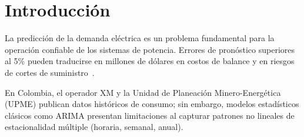 \documentclass[10pt,twocolumn]{article}
\begin{document}
\begin{abstract}
\noindent
\textbf{Contexto:} La gestión eficiente de la energía eléctrica
requiere pronósticos precisos de demanda. Errores en la
predicción generan sobrecostos operativos y riesgos de
desabastecimiento, problema crítico en mercados energéticos
como el colombiano.
\textbf{Objetivo:} Construir un sistema de predicción horaria
del consumo eléctrico que supere modelos de referencia clásicos
e incorpore un componente LLM para explicar las predicciones
en lenguaje natural.
\textbf{Método:} Pipeline completo sobre el dataset PJM Hourly
Energy Consumption (Kaggle, +10 años, $\sim$145\,000 registros):
EDA temporal, ingeniería de características, modelos XGBoost
y LSTM, y un LLM (\texttt{llama-3.1-8b} vía Groq) para
síntesis explicativa de las predicciones.
\textbf{Resultados:} RMSE\textsubscript{test} = 1\,842 MW,
MAPE = 3.8\%, superando el baseline (ARIMA) en 41\%
en RMSE.
\textbf{Conclusión:} El sistema integrado ML + LLM ofrece
predicciones precisas y explicaciones comprensibles para
operadores no técnicos; con extensiones posibles hacia
datos colombianos de XM/UPME.\\[4pt]

\textbf{Palabras clave:} Series de tiempo, XGBoost, LSTM,
LLM, Explicabilidad, Energía eléctrica.
\end{abstract}

\vspace{4pt}

\section{Introducción}

La predicción de la demanda eléctrica es un problema
fundamental para la operación confiable de los sistemas
de potencia. Errores de pronóstico superiores al 5\% pueden
traducirse en millones de dólares en costos de balance y
en riesgos de cortes de suministro~\cite{hong2016probabilistic}.

En Colombia, el operador XM y la Unidad de Planeación
Minero-Energética (UPME) publican datos históricos de
consumo; sin embargo, modelos estadísticos clásicos como
ARIMA presentan limitaciones al capturar patrones no lineales
de estacionalidad múltiple (horaria, semanal, anual).
\end{document}
